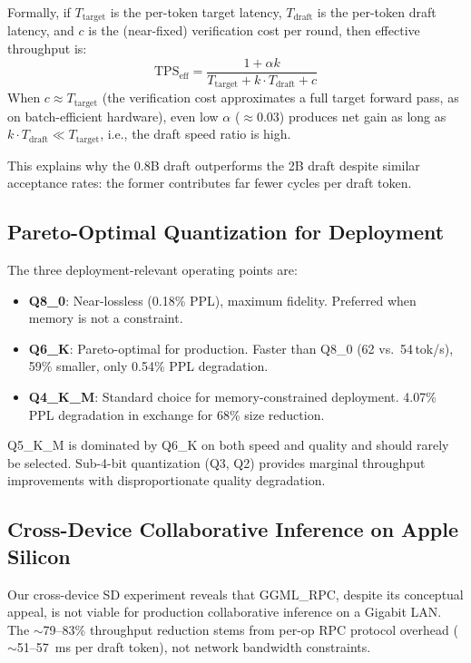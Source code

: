 \documentclass[11pt,a4paper]{article}
\newcommand{\tps}{\,tok/s}
\begin{document}
Formally, if $T_{\text{target}}$ is the per-token target latency,
$T_{\text{draft}}$ is the per-token draft latency, and $c$ is the (near-fixed)
verification cost per round, then effective throughput is:
\[
  \text{TPS}_{\text{eff}} = \frac{1 + \alpha k}{T_{\text{target}} + k \cdot T_{\text{draft}} + c}
\]
When $c \approx T_{\text{target}}$ (the verification cost approximates a full
target forward pass, as on batch-efficient hardware), even low $\alpha$ ($\approx 0.03$)
produces net gain as long as $k \cdot T_{\text{draft}} \ll T_{\text{target}}$,
i.e., the draft speed ratio is high.

This explains why the 0.8B draft outperforms the 2B draft despite similar
acceptance rates: the former contributes far fewer cycles per draft token.

\subsection{Pareto-Optimal Quantization for Deployment}

The three deployment-relevant operating points are:
\begin{itemize}
  \item \textbf{Q8\_0}: Near-lossless (0.18\% PPL), maximum fidelity.
    Preferred when memory is not a constraint.
  \item \textbf{Q6\_K}: Pareto-optimal for production.
    Faster than Q8\_0 (62 vs.\ 54\tps), 59\% smaller,
    only 0.54\% PPL degradation.
  \item \textbf{Q4\_K\_M}: Standard choice for memory-constrained deployment.
    4.07\% PPL degradation in exchange for 68\% size reduction.
\end{itemize}

Q5\_K\_M is dominated by Q6\_K on both speed and quality and should rarely be
selected.
Sub-4-bit quantization (Q3, Q2) provides marginal throughput improvements with
disproportionate quality degradation.

\subsection{Cross-Device Collaborative Inference on Apple Silicon}

Our cross-device SD experiment reveals that GGML\_RPC, despite its conceptual
appeal, is not viable for production collaborative inference on a Gigabit LAN.
The $\sim$79--83\% throughput reduction stems from per-op RPC protocol overhead
($\sim$51--57~ms per draft token), not network bandwidth constraints.
\end{document}
